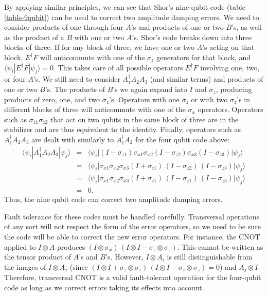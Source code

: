\documentclass{report}
\newcommand{\ket}[1]{|{#1}\rangle}
\newcommand{\bra}[1]{\langle{#1}|}
\newcommand{\X}{\sigma_x}
\newcommand{\Z}{\sigma_z}
\newcommand{\Xs}[1]{\sigma_{x{#1}}}
\newcommand{\Zs}[1]{\sigma_{z{#1}}}
\begin{document}
By applying similar principles, we can see that Shor's nine-qubit code (table
\ref{table-9qubit}) can be used to correct two amplitude damping errors.
We need to consider products of one through four $A$'s and products of one
or two $B$'s, as well as the product of a $B$ with one or two $A$'s.  Shor's
code breaks down into three blocks of three.  If for any block of three,
we have one or two $A$'s acting on that block, $E^\dagger F$ will anticommute
with one of the $\Z$ generators for that block, and $\bra{\psi_i} E^\dagger
F \ket{\psi_j} = 0$.  This takes care of all possible operators $E^\dagger F$
involving one, two, or four $A$'s.  We still need to consider $A_1^\dagger A_2
A_3$ (and similar terms) and products of one or two $B$'s.  The products of 
$B$'s we again expand into $I$ and $\Z$, producing products of zero, one, and 
two $\Z$'s.  Operators with one $\Z$ or with two $\Z$'s in different blocks of 
three will anticommute with one of the $\X$ operators.  Operators such as 
$\Zs{1} \Zs{2}$ that act on two qubits in the same block of three are in the 
stabilizer and are thus equivalent to the identity.  Finally, operators such as
$A_1^\dagger A_2 A_3$ are dealt with similarly to $A_1^\dagger A_2$ for the
four qubit code above:
\begin{eqnarray}
\bra{\psi_i} A_1^\dagger A_2 A_3 \ket{\psi_j} & \!\! = &
\!\! \bra{\psi_i} (I - \Zs{1}) \Xs{1} \Xs{2} (I - \Zs{2}) \Xs{3} (I - \Zs{3}) 
\ket{\psi_j} \\
& \!\! = & \!\! \bra{\psi_i} \Xs{1} \Xs{2} \Xs{3} (I + \Zs{1})\,(I - \Zs{2})\,
(I - \Zs{3}) \ket{\psi_j} \\
& \!\! = & \!\! \bra{\psi_i} \Xs{1} \Xs{2} \Xs{3} (I + \Zs{1})\,(I - \Zs{1})\,
(I - \Zs{3}) \ket{\psi_j} \\
& \!\! = & \!\! 0.
\end{eqnarray}
Thus, the nine qubit code can correct two amplitude damping errors.

Fault tolerance for these codes must be handled carefully.  Transversal
operations of any sort will not respect the form of the error operators, so
we need to be sure the code will be able to correct the new error operators.
For instance, the CNOT applied to $I \otimes A$ produces $(I \otimes \X)\,
(I \otimes I - \Z \otimes \Z)$.  This cannot be written as the tensor product
of $A$'s and $B$'s.  However, $I \otimes A_i$ is still distinguishable from the 
images of $I \otimes A_j$ (since $(I \otimes I + \Z \otimes \Z)\,(I \otimes I
- \Z \otimes \Z) = 0$) and $A_j \otimes I$.  Therefore, transversal CNOT is
a valid fault-tolerant operation for the four-qubit code as long as we correct 
errors taking its effects into account.
\end{document}
